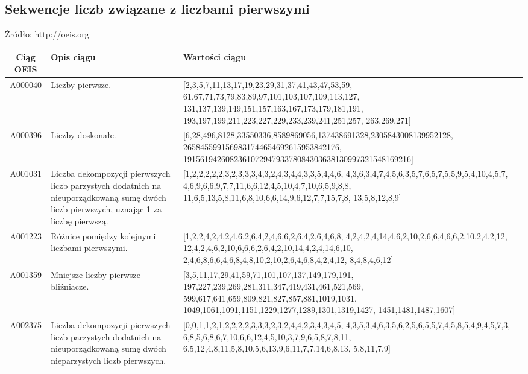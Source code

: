 \documentclass[10pt,onecolumn]{article}
\theoremstyle{definition}
\theoremstyle{hypothesis}
\theoremstyle{capability}
\begin{document}
\begin{landscape}

\section{Sekwencje liczb związane z liczbami pierwszymi}

Źródło: http://oeis.org

\begin{tabularx}{\linewidth}{ |c|X|X| }
  \hline 
  \rowcolor{LightCyan}
  Ciąg OEIS & Opis ciągu & Wartości ciągu \\
  \hline
A000040 & Liczby pierwsze. &
[2,3,5,7,11,13,17,19,23,29,31,37,41,43,47,53,59,
 61,67,71,73,79,83,89,97,101,103,107,109,113,127,
 131,137,139,149,151,157,163,167,173,179,181,191,
 193,197,199,211,223,227,229,233,239,241,251,257,
 263,269,271] \\
  \hline
A000396 & Liczby doskonałe. &
[6,28,496,8128,33550336,8589869056,137438691328,2305843008139952128,
 2658455991569831744654692615953842176,
 191561942608236107294793378084303638130997321548169216] \\
  \hline
A001031 & Liczba dekompozycji pierwszych liczb parzystych dodatnich na nieuporządkowaną sumę dwóch liczb pierwszych, uznając 1 za liczbę pierwszą. & 
[1,2,2,2,2,2,3,2,3,3,3,4,3,2,4,3,4,4,3,3,5,4,4,6,
 4,3,6,3,4,7,4,5,6,3,5,7,6,5,7,5,5,9,5,4,10,4,5,7,
 4,6,9,6,6,9,7,7,11,6,6,12,4,5,10,4,7,10,6,5,9,8,8,
 11,6,5,13,5,8,11,6,8,10,6,6,14,9,6,12,7,7,15,7,8,
 13,5,8,12,8,9] \\
  \hline
A001223 & Różnice pomiędzy kolejnymi liczbami pierwszymi. & 
[1,2,2,4,2,4,2,4,6,2,6,4,2,4,6,6,2,6,4,2,6,4,6,8,
 4,2,4,2,4,14,4,6,2,10,2,6,6,4,6,6,2,10,2,4,2,12,
 12,4,2,4,6,2,10,6,6,6,2,6,4,2,10,14,4,2,4,14,6,10,
 2,4,6,8,6,6,4,6,8,4,8,10,2,10,2,6,4,6,8,4,2,4,12,
 8,4,8,4,6,12] \\
  \hline
A001359 & Mniejsze liczby pierwsze bliźniacze. & 
[3,5,11,17,29,41,59,71,101,107,137,149,179,191,
 197,227,239,269,281,311,347,419,431,461,521,569,
 599,617,641,659,809,821,827,857,881,1019,1031,
 1049,1061,1091,1151,1229,1277,1289,1301,1319,1427,
 1451,1481,1487,1607] \\
  \hline
A002375 & Liczba dekompozycji pierwszych liczb parzystych dodatnich na nieuporządkowaną sumę dwóch nieparzystych liczb pierwszych. & 
[0,0,1,1,2,1,2,2,2,2,3,3,3,2,3,2,4,4,2,3,4,3,4,5,
 4,3,5,3,4,6,3,5,6,2,5,6,5,5,7,4,5,8,5,4,9,4,5,7,3,
 6,8,5,6,8,6,7,10,6,6,12,4,5,10,3,7,9,6,5,8,7,8,11,
 6,5,12,4,8,11,5,8,10,5,6,13,9,6,11,7,7,14,6,8,13,
 5,8,11,7,9] \\

\end{tabularx}
\end{landscape}
\end{document}
